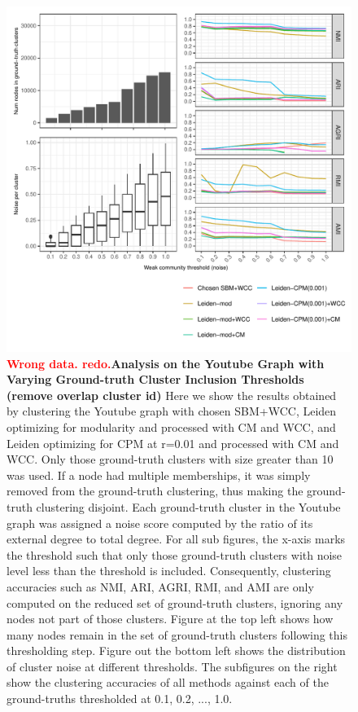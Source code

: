 \documentclass[aps,pre,superscriptaddress]{revtex4}
\begin{document}
\begin{figure}[!htpb]
	\centering
	\includegraphics[]{figures/accuracy_remove_overlap.pdf}
	\caption[]{\textbf{\textcolor{red}{Wrong data. redo.}Analysis on the Youtube Graph with Varying Ground-truth Cluster Inclusion Thresholds (remove overlap cluster id)} Here we show the results obtained by clustering the Youtube graph with chosen SBM+WCC, Leiden optimizing for modularity and processed with CM and WCC, and Leiden optimizing for CPM at r=0.01 and processed with CM and WCC. Only those ground-truth clusters with size greater than 10 was used. If a node had multiple memberships, it was simply removed from the ground-truth clustering, thus making the ground-truth clustering disjoint. Each ground-truth cluster in the Youtube graph was assigned a noise score computed by the ratio of its external degree to total degree. For all sub figures, the x-axis marks the threshold such that only those ground-truth clusters with noise level less than the threshold is included. Consequently, clustering accuracies such as NMI, ARI, AGRI, RMI, and AMI are only computed on the reduced set of ground-truth clusters, ignoring any nodes not part of those clusters. Figure at the top left shows how many nodes remain in the set of ground-truth clusters following this thresholding step. Figure out the bottom left shows the distribution of cluster noise at different thresholds. The subfigures on the right show the clustering accuracies of all methods against each of the ground-truths thresholded at 0.1, 0.2, ..., 1.0. }
	\label{fig:youtube-accuracy-remove-overlap}
\end{figure}
\end{document}
